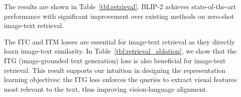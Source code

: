 The results are shown in Table~\ref{tbl:retrieval}.
BLIP-2 achieves state-of-the-art performance with significant improvement over existing methods on zero-shot image-text retrieval.



The ITC and ITM losses are essential for image-text retrieval as they directly learn image-text similarity.
In Table~\ref{tbl:retrieval_ablation},
we show that the ITG (image-grounded text generation) loss is also beneficial for image-text retrieval.
This result supports our intuition in designing the representation learning objectives: the ITG loss enforces the queries to extract visual features most relevant to the text,
thus improving vision-language alignment. 











